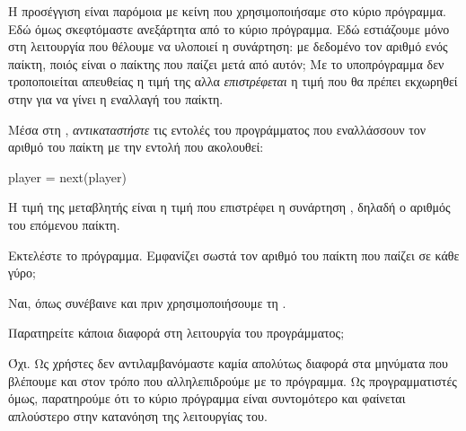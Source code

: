 \documentclass[a4paper,11pt,oneside]{book}
\begin{document}
\begin{step}
\begin{answer}
Η προσέγγιση είναι παρόμοια με κείνη που χρησιμοποιήσαμε στο κύριο πρόγραμμα. Εδώ όμως σκεφτόμαστε ανεξάρτητα από το κύριο πρόγραμμα. Εδώ εστιάζουμε μόνο στη λειτουργία που θέλουμε να υλοποιεί η συνάρτηση: με δεδομένο τον αριθμό  ενός παίκτη, ποιός είναι ο παίκτης που παίζει μετά από αυτόν;  
Με το υποπρόγραμμα δεν τροποποιείται απευθείας η τιμή της  αλλα \emph{επιστρέφεται} η τιμή που θα πρέπει εκχωρηθεί στην  για να γίνει η εναλλαγή του παίκτη. 
\end{answer}
\end{step}

\begin{step} 
Μέσα στη , \emph{αντικαταστήστε} τις εντολές του προγράμματος που εναλλάσσουν τον αριθμό του παίκτη με την εντολή που ακολουθεί:

\begin{pynew}
    player = next(player)
\end{pynew}

Η τιμή της μεταβλητής  είναι η τιμή που επιστρέφει η συνάρτηση , δηλαδή ο αριθμός του επόμενου παίκτη.

Εκτελέστε το πρόγραμμα. Εμφανίζει σωστά τον αριθμό του παίκτη που παίζει σε κάθε γύρο; 

\begin{answer}
Ναι, όπως συνέβαινε και πριν χρησιμοποιήσουμε τη . 
\end{answer}

Παρατηρείτε κάποια διαφορά στη λειτουργία του προγράμματος;

\begin{answer}
Όχι. Ως χρήστες δεν αντιλαμβανόμαστε καμία απολύτως διαφορά στα μηνύματα που βλέπουμε και στον τρόπο που αλληλεπιδρούμε με το πρόγραμμα. Ως προγραμματιστές όμως, παρατηρούμε ότι το κύριο πρόγραμμα είναι συντομότερο και φαίνεται απλούστερο στην κατανόηση της λειτουργίας του. 
\end{answer}
\end{step}
\end{document}
